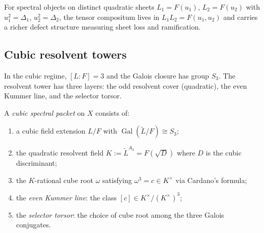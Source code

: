 For spectral objects on distinct quadratic sheets
$L_1 = F(u_1)$, $L_2 = F(u_2)$ with $u_1^2 = \Delta_1$,
$u_2^2 = \Delta_2$, the tensor compositum lives in
$L_1 L_2 = F(u_1, u_2)$ and carries a richer defect structure
measuring sheet loss and ramification.

\subsection{Cubic resolvent towers}
\label{subsec:cubic-resolvent-towers}

In the cubic regime, $[L:F] = 3$ and the Galois closure has group
$S_3$.  The resolvent tower has three layers: the odd resolvent
cover (quadratic), the even Kummer line, and the selector torsor.

\begin{definition}
\label{def:cubic-spectral-packet}
A \emph{cubic spectral packet} on $X$ consists of:
\begin{enumerate}[label=\textup{(\roman*)}]
\item a cubic field extension $L/F$ with
  $\operatorname{Gal}(\tilde{L}/F) \cong S_3$;
\item the quadratic resolvent field
  $K := \tilde{L}^{A_3} = F(\sqrt{D})$ where $D$ is the
  cubic discriminant;
\item the $K$-rational cube root $\omega$
  satisfying $\omega^3 = c \in K^\times$ via
  Cardano's formula;
\item the \emph{even Kummer line}:
  the class $[c] \in K^\times/(K^\times)^3$;
\item the \emph{selector torsor}: the choice of cube root
  among the three Galois conjugates.
\end{enumerate}
\end{definition}


